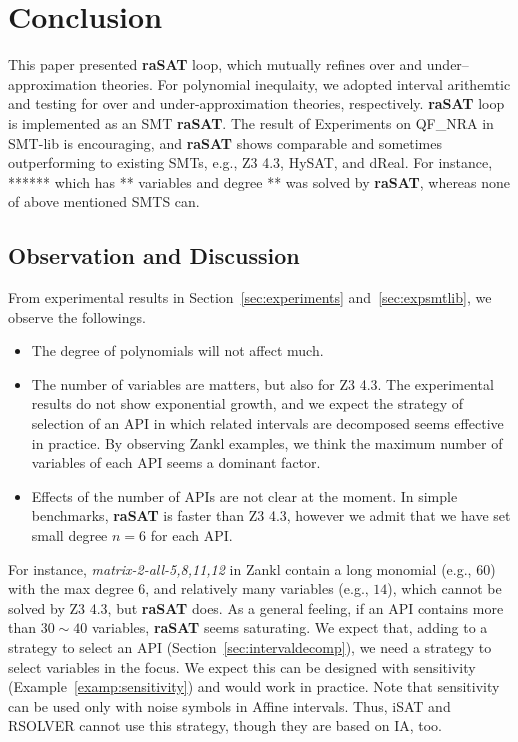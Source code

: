 \chapter{Conclusion}


This paper presented {\bf raSAT} loop, which mutually refines over and under--approximation 
theories. For polynomial inequlaity, we adopted interval arithemtic and testing for 
over and under-approximation theories, respectively. 
{\bf raSAT} loop is implemented as an SMT {\bf raSAT}. 
The result of Experiments on QF\_NRA in SMT-lib is encouraging, and 
{\bf raSAT} shows comparable and sometimes outperforming to existing SMTs, e.g., 
Z3 4.3, HySAT, and dReal. For instance, ****** which has ** variables and degree ** 
was solved by {\bf raSAT}, whereas none of above mentioned SMTS can. 
%

\section{Observation and Discussion} 

From experimental results in Section~\ref{sec:experiments} and~\ref{sec:expsmtlib}, 
we observe the followings. 
\begin{itemize}
\item The degree of polynomials will not affect much. 
\item The number of variables are matters, but also for Z3 4.3. 
The experimental results do not show exponential growth, and we expect 
the strategy of selection of an API in which related intervals are decomposed
seems effective in practice. By observing Zankl examples, we think the maximum 
number of variables of each API seems a dominant factor. 
\item Effects of the number of APIs are not clear at the moment. In simple benchmarks, 
{\bf raSAT} is faster than Z3 4.3, however we admit that we have set small degree $n=6$
for each API. 
\end{itemize}

For instance, {\em matrix-2-all-5,8,11,12} in Zankl 
contain a long monomial (e.g., $60$) with the max degree $6$, and 
relatively many variables (e.g., $14$), which cannot be solved by Z3 4.3, but 
{\bf raSAT} does. 
As a general feeling, if an API contains more than $30 \sim 40$ variables, 
{\bf raSAT} seems saturating. 
We expect that, adding to a strategy to select an API (Section~\ref{sec:intervaldecomp}), 
we need a strategy to select variables in the focus. We expect this can be designed 
with sensitivity (Example~\ref{examp:sensitivity}) and would work in practice. 
Note that sensitivity can be used only with noise symbols in Affine intervals. 
Thus, iSAT and RSOLVER cannot use this strategy, though they are based on IA, too. 

